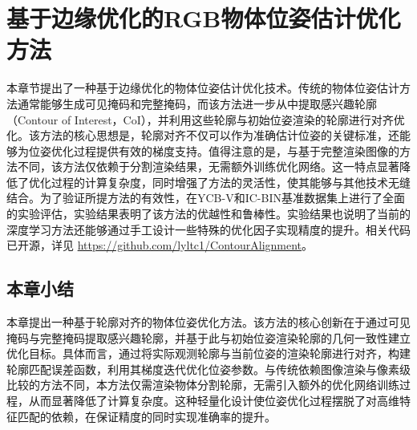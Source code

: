 \chapter{基于边缘优化的RGB物体位姿估计优化方法}

本章节提出了一种基于边缘优化的物体位姿估计优化技术。传统的物体位姿估计方法通常能够生成可见掩码和完整掩码，而该方法进一步从中提取感兴趣轮廓（Contour of Interest，CoI），并利用这些轮廓与初始位姿渲染的轮廓进行对齐优化。该方法的核心思想是，轮廓对齐不仅可以作为准确估计位姿的关键标准，还能够为位姿优化过程提供有效的梯度支持。值得注意的是，与基于完整渲染图像的方法不同，该方法仅依赖于分割渲染结果，无需额外训练优化网络。这一特点显著降低了优化过程的计算复杂度，同时增强了方法的灵活性，使其能够与其他技术无缝结合。为了验证所提方法的有效性，在YCB-V和IC-BIN基准数据集上进行了全面的实验评估，实验结果表明了该方法的优越性和鲁棒性。实验结果也说明了当前的深度学习方法还能够通过手工设计一些特殊的优化因子实现精度的提升。相关代码已开源，详见 \href{https://github.com/lyltc1/ContourAlignment}{https://github.com/lyltc1/ContourAlignment}。


\section{本章小结}
本章提出一种基于轮廓对齐的物体位姿优化方法。该方法的核心创新在于通过可见掩码与完整掩码提取感兴趣轮廓，并基于此与初始位姿渲染轮廓的几何一致性建立优化目标。具体而言，通过将实际观测轮廓与当前位姿的渲染轮廓进行对齐，构建轮廓匹配误差函数，利用其梯度迭代优化位姿参数。与传统依赖图像渲染与像素级比较的方法不同，本方法仅需渲染物体分割轮廓，无需引入额外的优化网络训练过程，从而显著降低了计算复杂度。这种轻量化设计使位姿优化过程摆脱了对高维特征匹配的依赖，在保证精度的同时实现准确率的提升。